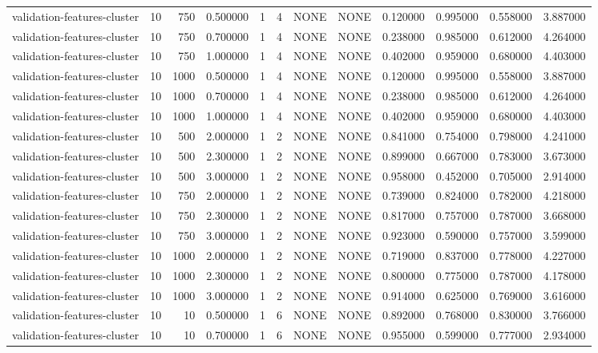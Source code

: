 \begin{tabular}{lrrrllllrrrr}
validation-features-cluster & 10 & 750 & 0.500000 & 1 & 4 & NONE & NONE & 0.120000 & 0.995000 & 0.558000 & 3.887000 \\
validation-features-cluster & 10 & 750 & 0.700000 & 1 & 4 & NONE & NONE & 0.238000 & 0.985000 & 0.612000 & 4.264000 \\
validation-features-cluster & 10 & 750 & 1.000000 & 1 & 4 & NONE & NONE & 0.402000 & 0.959000 & 0.680000 & 4.403000 \\
validation-features-cluster & 10 & 1000 & 0.500000 & 1 & 4 & NONE & NONE & 0.120000 & 0.995000 & 0.558000 & 3.887000 \\
validation-features-cluster & 10 & 1000 & 0.700000 & 1 & 4 & NONE & NONE & 0.238000 & 0.985000 & 0.612000 & 4.264000 \\
validation-features-cluster & 10 & 1000 & 1.000000 & 1 & 4 & NONE & NONE & 0.402000 & 0.959000 & 0.680000 & 4.403000 \\
validation-features-cluster & 10 & 500 & 2.000000 & 1 & 2 & NONE & NONE & 0.841000 & 0.754000 & 0.798000 & 4.241000 \\
validation-features-cluster & 10 & 500 & 2.300000 & 1 & 2 & NONE & NONE & 0.899000 & 0.667000 & 0.783000 & 3.673000 \\
validation-features-cluster & 10 & 500 & 3.000000 & 1 & 2 & NONE & NONE & 0.958000 & 0.452000 & 0.705000 & 2.914000 \\
validation-features-cluster & 10 & 750 & 2.000000 & 1 & 2 & NONE & NONE & 0.739000 & 0.824000 & 0.782000 & 4.218000 \\
validation-features-cluster & 10 & 750 & 2.300000 & 1 & 2 & NONE & NONE & 0.817000 & 0.757000 & 0.787000 & 3.668000 \\
validation-features-cluster & 10 & 750 & 3.000000 & 1 & 2 & NONE & NONE & 0.923000 & 0.590000 & 0.757000 & 3.599000 \\
validation-features-cluster & 10 & 1000 & 2.000000 & 1 & 2 & NONE & NONE & 0.719000 & 0.837000 & 0.778000 & 4.227000 \\
validation-features-cluster & 10 & 1000 & 2.300000 & 1 & 2 & NONE & NONE & 0.800000 & 0.775000 & 0.787000 & 4.178000 \\
validation-features-cluster & 10 & 1000 & 3.000000 & 1 & 2 & NONE & NONE & 0.914000 & 0.625000 & 0.769000 & 3.616000 \\
validation-features-cluster & 10 & 10 & 0.500000 & 1 & 6 & NONE & NONE & 0.892000 & 0.768000 & 0.830000 & 3.766000 \\
validation-features-cluster & 10 & 10 & 0.700000 & 1 & 6 & NONE & NONE & 0.955000 & 0.599000 & 0.777000 & 2.934000 \\

\end{tabular}
